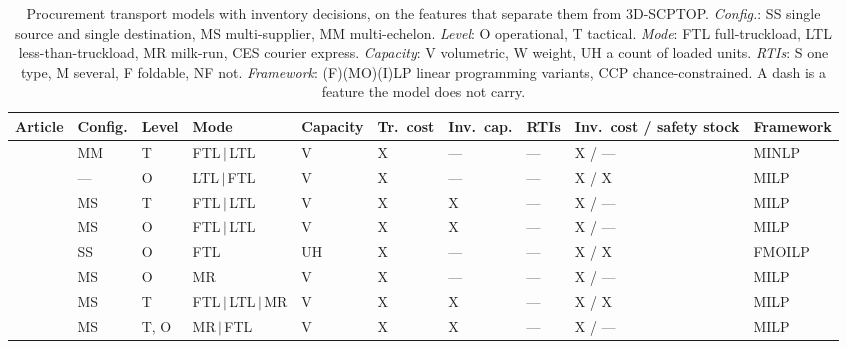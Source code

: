 \begin{table}[!htbp]
  \centering
  \small
  \caption{Procurement transport models with inventory decisions, on the
  features that separate them from 3D-SCPTOP. \emph{Config.}: SS single
  source and single destination, MS multi-supplier, MM multi-echelon.
  \emph{Level}: O operational, T tactical. \emph{Mode}: FTL
  full-truckload, LTL less-than-truckload, MR milk-run, CES courier
  express. \emph{Capacity}: V volumetric, W weight, UH a count of
  loaded units. \emph{RTIs}: S one type, M several, F foldable, NF not.
  \emph{Framework}: (F)(MO)(I)LP linear programming variants, CCP
  chance-constrained. A dash is a feature the model does not carry.}
  \label{table:ComProTra}
  \begin{adjustbox}{width=\textwidth}
  \begin{tabular}{llllllllll}
    \toprule
    Article & Config. & Level & Mode & Capacity & Tr.\ cost & Inv.\ cap. & RTIs & Inv.\ cost / safety stock & Framework \\
    \midrule
    \autocite{Berman2006InboundCost}            & MM & T   & FTL\,$|$\,LTL            & V        & X & ---  & ---      & X / ---  & MINLP  \\
    \autocite{Sancak2011Multi-itemPolicy}       & ---& O   & LTL\,$|$\,FTL            & V        & X & ---  & ---      & X / X    & MILP   \\
    \autocite{Schoneberg2010AnNetworks}         & MS & T   & FTL\,$|$\,LTL            & V        & X & X    & ---      & X / ---  & MILP   \\
    \autocite{Schoneberg2013ANetworks}          & MS & O   & FTL\,$|$\,LTL            & V        & X & X    & ---      & X / ---  & MILP   \\
    \autocite{Diaz-Madronero2014APlanning}      & SS & O   & FTL                      & UH       & X & ---  & ---      & X / X    & FMOILP \\
    \autocite{Hein2016QuantitativeProblem}      & MS & O   & MR                       & V        & X & ---  & ---      & X / ---  & MILP   \\
    \autocite{Diaz-Madronero2017ADecisions}     & MS & T   & FTL\,$|$\,LTL\,$|$\,MR   & V        & X & X    & ---      & X / X    & MILP   \\
    \autocite{Meyer2018TransportIndustry}       & MS & T, O& MR\,$|$\,FTL             & V        & X & X    & ---      & X / ---  & MILP   \\

\end{tabular}
\end{adjustbox}
\end{table}
